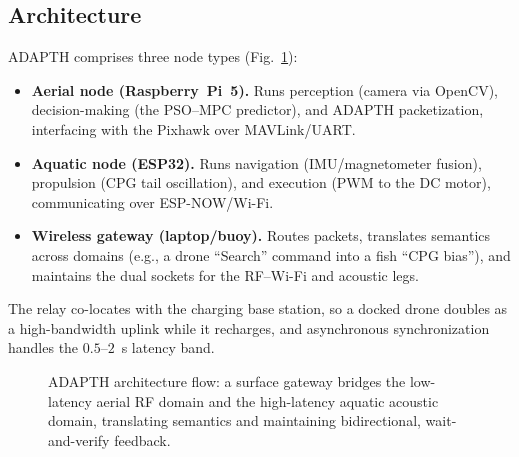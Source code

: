 \documentclass[journal]{IEEEtran}
\begin{document}
\subsection{Architecture}
ADAPTH comprises three node types (Fig.~\ref{fig:adapth_arch}):
\begin{itemize}
  \item \textbf{Aerial node (Raspberry~Pi~5).} Runs perception (camera via
  OpenCV), decision-making (the PSO--MPC predictor), and ADAPTH packetization,
  interfacing with the Pixhawk over MAVLink/UART.
  \item \textbf{Aquatic node (ESP32).} Runs navigation (IMU/magnetometer fusion),
  propulsion (CPG tail oscillation), and execution (PWM to the DC motor),
  communicating over ESP-NOW/Wi-Fi.
  \item \textbf{Wireless gateway (laptop/buoy).} Routes packets, translates
  semantics across domains (e.g., a drone ``Search'' command into a fish ``CPG
  bias''), and maintains the dual sockets for the RF--Wi-Fi and acoustic legs.
\end{itemize}
The relay co-locates with the charging base station, so a docked drone doubles as
a high-bandwidth uplink while it recharges, and asynchronous synchronization
handles the $0.5$--$2$~s latency band.

\begin{figure}[!t]
\centering
{}
\caption{ADAPTH architecture flow: a surface gateway bridges the low-latency aerial
RF domain and the high-latency aquatic acoustic domain, translating semantics and
maintaining bidirectional, wait-and-verify feedback.}
\label{fig:adapth_arch}
\end{figure}
\end{document}
